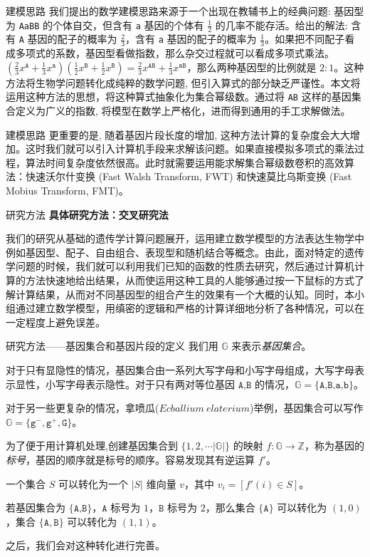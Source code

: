 \documentclass{beamer}
\begin{document}
	\begin{frame}{建模思路}
		我们提出的数学建模思路来源于一个出现在教辅书上的经典问题: 基因型为 \texttt{AaBB} 的个体自交，但含有 \texttt{a} 基因的个体有 $\frac{1}{2}$ 的几率不能存活。给出的解法: 含有 \texttt{A} 基因的配子的概率为 $\frac{2}{3}$，含有 \texttt{a} 基因的配子的概率为 $\frac{1}{3}$。如果把不同配子看成多项式的系数，基因型看做指数，那么杂交过程就可以看成多项式乘法。$(\frac{2}{3}x^{\texttt{A}}+\frac{1}{3}x^{\texttt{a}})(\frac{1}{2}x^{\texttt{B}}+\frac{1}{2}x^{\texttt{B}})=\frac{2}{3}x^{\texttt{AB}}+\frac{1}{3}x^{\texttt{aB}}$，那么两种基因型的比例就是 $2 : 1$。这种方法将生物学问题转化成纯粹的数学问题, 但引入算式的部分缺乏严谨性。本文将运用这种方法的思想，将这种算式抽象化为集合幂级数。通过将 \texttt{AB} 这样的基因集合定义为广义的指数, 将模型在数学上严格化，进而得到通用的手工求解做法。
	\end{frame}

	\begin{frame}{建模思路}
		更重要的是, 随着基因片段长度的增加, 这种方法计算的复杂度会大大增加。这时我们就可以引入计算机手段来求解该问题。如果直接模拟多项式的乘法过程，算法时间复杂度依然很高。此时就需要运用能求解集合幂级数卷积的高效算法：快速沃尔什变换 (Fast Walsh Transform, FWT) 和快速莫比乌斯变换 (Fast Mobius Transform, FMT)。
	\end{frame}

	\begin{frame}{研究方法}
		\textbf{具体研究方法：交叉研究法}
		
		我们的研究从基础的遗传学计算问题展开，运用建立数学模型的方法表达生物学中例如基因型、配子、自由组合、表现型和随机结合等概念。由此，面对特定的遗传学问题的时候，我们就可以利用我们已知的函数的性质去研究，然后通过计算机计算的方法快速地给出结果，从而使运用这种工具的人能够通过按一下鼠标的方式了解计算结果，从而对不同基因型的组合产生的效果有一个大概的认知。同时，本小组通过建立数学模型，用缜密的逻辑和严格的计算详细地分析了各种情况，可以在一定程度上避免误差。
	\end{frame}

	\begin{frame}{研究方法——基因集合和基因片段的定义}
		我们用 $\mathbb{G}$ 来表示\textsl{基因集合}。
		
		对于只有显隐性的情况，基因集合由一系列大写字母和小写字母组成，大写字母表示显性，小写字母表示隐性。对于只有两对等位基因 $\texttt{A,B}$ 的情况，$\mathbb{G}=\{\texttt{A,B,a,b}\}$。
		
		对于另一些更复杂的情况，拿喷瓜($\mathit{Ecballium\ elaterium}$)举例，基因集合可以写作 $\mathbb{G}=\{\texttt{g}^{-},\texttt{g}^{+},\texttt{G}\}$。
		
		为了便于用计算机处理,创建基因集合到 $\{1,2,\cdots |\mathbb{G}|\}$ 的映射 $f:\mathbb{G} \to \mathbb{Z}$，称为基因的\textsl{标号}，基因的顺序就是标号的顺序。容易发现其有逆运算 $f'$。
		
		一个集合 $S$ 可以转化为一个 $|S|$ 维向量 $v$，其中 $v_i=[f'(i) \in S]$。
		
		若基因集合为 $\{\texttt{A,B}\}$，$\texttt{A}$ 标号为 $1$，$\texttt{B}$ 标号为 $2$，那么集合 $\{\texttt{A}\}$ 可以转化为 $(1,0)$，集合 $\{\texttt{A},\texttt{B}\}$ 可以转化为 $(1,1)$。
		
		之后，我们会对这种转化进行完善。
	\end{frame}
\end{document}
